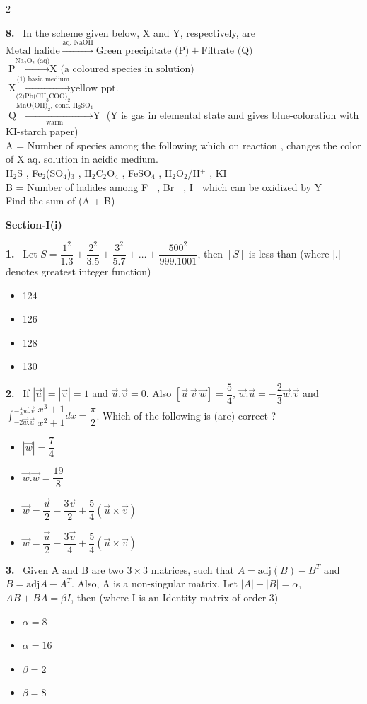 \documentclass[10pt]{extarticle}
\newcommand{\partsec}[2]{\par\medskip\noindent{\large\bfseries PART-#1: #2}\par\smallskip}
\newcommand{\sect}[1]{\par\smallskip\noindent\textbf{#1}\par}
\newcommand{\qn}[1]{\par\smallskip\noindent\textbf{#1.}~}
\newenvironment{qoptions}{\begin{itemize}[leftmargin=1.8em,itemsep=1pt,topsep=2pt,label={}]}{\end{itemize}}
\newcommand{\opt}[2]{\item[(#1)] #2}
\begin{document}
\begin{multicols}{2}
\qn{8} In the scheme given below, X and Y, respectively, are\\
$\text{Metal halide}\xrightarrow{\text{aq. NaOH}}\text{Green precipitate (P)}+\text{Filtrate (Q)}$\\
$\text{P}\xrightarrow{\text{Na}_2\text{O}_2\text{ (aq)}}\text{X (a coloured species in solution)}$\\
$\text{X}\xrightarrow[\text{(2)Pb(CH}_3\text{COO)}_2]{\text{(1) basic medium}}\text{yellow ppt.}$\\
$\text{Q}\xrightarrow[\text{warm}]{\text{MnO(OH)}_2,\ \text{conc. H}_2\text{SO}_4}\text{Y}$ (Y is gas in elemental state and gives blue-coloration with KI-starch paper)\\
A = Number of species among the following which on reaction , changes the color of X aq. solution in acidic medium.\\
H$_2$S , Fe$_2$(SO$_4$)$_3$ , H$_2$C$_2$O$_4$ , FeSO$_4$ , H$_2$O$_2$/H$^+$ , KI\\
B = Number of halides among F$^-$ , Br$^-$ , I$^-$ which can be oxidized by Y\\
Find the sum of (A + B)

\partsec{3}{MATHEMATICS}
\sect{Section-I(i)}

\qn{1} Let $S=\dfrac{1^2}{1.3}+\dfrac{2^2}{3.5}+\dfrac{3^2}{5.7}+\dots+\dfrac{500^2}{999.1001}$, then $[S]$ is less than (where [.] denotes greatest integer function)
\begin{qoptions}
\opt{A}{124}
\opt{B}{126}
\opt{C}{128}
\opt{D}{130}
\end{qoptions}

\qn{2} If $|\vec u|=|\vec v|=1$ and $\vec u.\vec v=0$. Also $[\vec u\ \vec v\ \vec w]=\dfrac54$, $\vec w.\vec u=-\dfrac23\vec w.\vec v$ and $\displaystyle\int_{-2\vec w.\vec u}^{-\frac43\vec w.\vec v}\dfrac{x^3+1}{x^2+1}dx=\dfrac\pi2$. Which of the following is (are) correct ?
\begin{qoptions}
\opt{A}{$|\vec w|=\dfrac74$}
\opt{B}{$\vec w.\vec w=\dfrac{19}8$}
\opt{C}{$\vec w=\dfrac{\vec u}2-\dfrac{3\vec v}2+\dfrac54(\vec u\times\vec v)$}
\opt{D}{$\vec w=\dfrac{\vec u}2-\dfrac{3\vec v}4+\dfrac54(\vec u\times\vec v)$}
\end{qoptions}

\qn{3} Given A and B are two $3\times3$ matrices, such that $A=\text{adj}(B)-B^T$ and $B=\text{adj}A-A^T$. Also, A is a non-singular matrix. Let $|A|+|B|=\alpha$, $AB+BA=\beta I$, then (where I is an Identity matrix of order 3)
\begin{qoptions}
\opt{A}{$\alpha=8$}
\opt{B}{$\alpha=16$}
\opt{C}{$\beta=2$}
\opt{D}{$\beta=8$}
\end{qoptions}


\end{multicols}
\end{document}
